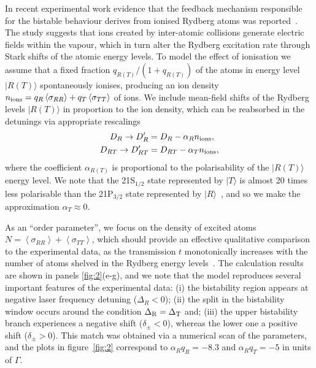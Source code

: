 \documentclass[twocolumn,aps,prl,nobibnotes,8pt]{revtex4-1}
\newcommand{\ket}[1]{\ensuremath{\vert{#1}\rangle}}
\newcommand{\be}{\begin{equation}}
\newcommand{\ee}{\end{equation}}
\newcommand{\lt}{\left(}
\newcommand{\rt}{\right)}
\newcommand{\lan}{\left\langle}
\newcommand{\ran}{\right\rangle}
\newcommand{\av}[1]{\lan #1 \ran}
\newcommand{\rind}{R}
\newcommand{\tind}{T}
\begin{document}
In recent experimental work evidence that the feedback mechanism responsible for the bistable behaviour derives from ionised Rydberg atoms was reported~\cite{Weller16}.
The study suggests that ions created by inter-atomic collisions generate electric fields within the vapour, which in turn alter the Rydberg excitation rate through Stark shifts of the atomic energy levels. 
To model the effect of ionisation we assume that a fixed fraction $q_{\rind (\tind)} / \lt  1 + q_{\rind (\tind)} \rt$ of the atoms in energy level $\ket{\rind (\tind)}$ spontaneously ionises, producing an ion density $n_{\rm{ions}} = q_\rind \av{\sigma_{\rind \rind}} + q_\tind \av{\sigma_{\tind \tind}}$ of ions. 
We include mean-field shifts of the Rydberg levels $\ket{\rind(\tind)}$ in proportion to the ion density, which can be reabsorbed in the detunings via appropriate rescalings
\be
\begin{split}
	D_\rind  \to D_\rind' & = D_\rind - \alpha_R n_{\rm{ions}}, \\
	D_{\rind \tind} \to D_{\rind \tind}' & = D_{\rind \tind} - \alpha_T n_{\rm{ions}},
	\label{eq:drdt}
\end{split}
\ee
where the coefficient $\alpha_{R(T)}$ is proportional to the polarisability of the $\ket{\rind(\tind)}$ energy level.
We note that the 21S$_{1/2}$ state represented by $\ket{\tind}$ is almost 20 times less polarisable than the 21P$_{3/2}$ state represented by $\ket{\rind}$~\cite{Sibalic17}, and so we make the approximation $\alpha_T \approx 0$.

As an ``order parameter'', we focus on the density of excited atoms $N = \av{\sigma_{\rind \rind}} + \av{\sigma_{\tind \tind}}$, which should provide an effective qualitative comparison to the experimental data, as the transmission $t$ monotonically increases with the number of atoms shelved in the Rydberg energy levels~\cite{Thoumany09}. 
The calculation results are shown in panels \ref{fig:2}(e-g), and we note that the model reproduces several important features of the experimental data:
(i) the bistability region appears at negative laser frequency detuning ($\Delta_R < 0$);
(ii) the split in the bistability window occurs around the condition $\Delta_{{\rm R}} = \Delta_{{\rm T}}$ and; 
(iii) the upper bistability branch experiences a negative shift ($\delta_{\pm} < 0$), whereas the lower one a positive shift ($\delta_{\pm} > 0$). 
This match was obtained via a numerical scan of the parameters, and the plots in figure~\ref{fig:2} correspond to $\alpha_R q_\rind = -8.3$ and $\alpha_R q_\tind = -5$ in units of $\Gamma$.
\end{document}

